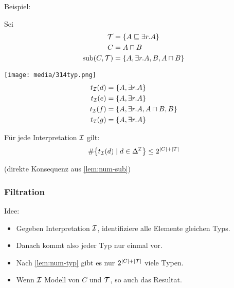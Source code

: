 \begin{tafel}\label{t:typen}
Beispiel:

Sei
\begin{align*}
    \mathcal{T} &=\{A \sqsubseteq \exists r.A\}\\
    C &= A \sqcap B\\
    \operatorname{sub}(C,\mathcal{T}) &= \{A, \exists r.A, B, A \sqcap B\}
\end{align*}

\texttt{[image: media/314typ.png]}
\begin{align*}
    t_{\mathcal{I}}(d)&=\{A, \exists r.A\}\\
    t_{\mathcal{I}}(e)&=\{A, \exists r.A\}\\
    t_{\mathcal{I}}(f)&=\{A, \exists r.A, A \sqcap B, B\}\\
    t_{\mathcal{I}}(g)&=\{A, \exists r.A\}
\end{align*}
\end{tafel}

\begin{lemma}
    \label{lem:num-typ}
Für jede Interpretation $\mathcal{I}$ gilt:
\[ \#\left\{ t_\MI\left( d \right) \mid d \in \Delta^\MI \right\} \leq 2^{\left| C \right| + |T|} \]
\end{lemma}
(direkte Konsequenz aus \autoref{lem:num-sub})

\subsubsection{Filtration}\label{filtration}
Idee:

\begin{itemize}
  \item Gegeben Interpretation $\mathcal{I}$, identifiziere alle Elemente gleichen Typs.
  \item Danach kommt also jeder Typ nur einmal vor.
  \item Nach \autoref{lem:num-typ} gibt es nur $2^{|C|+|\mathcal{T}|}$ viele Typen.
  \item Wenn $\mathcal{I}$ Modell von $C$ und $\mathcal{T}$, so auch das Resultat.
\end{itemize}

